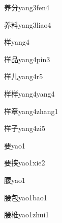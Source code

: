 \begin{verbete}[9;4]{养分}{yang3fen4}
\end{verbete}

\begin{verbete}[9;10]{养料}{yang3liao4}
\end{verbete}

\begin{verbete}[10]{样}{yang4}
\end{verbete}

\begin{verbete}[10;9]{样品}{yang4pin3}
\end{verbete}

\begin{verbete}[10;2]{样儿}{yang4r5}
\end{verbete}

\begin{verbete}[10;10]{样样}{yang4yang4}
\end{verbete}

\begin{verbete}[10;11]{样章}{yang4zhang1}
\end{verbete}

\begin{verbete}[10;3]{样子}{yang4zi5}
\end{verbete}

\begin{verbete}[9]{要}{yao1}
\end{verbete}

\begin{verbete}[9;9]{要挟}{yao1xie2}
\end{verbete}

\begin{verbete}[13]{腰}{yao1}
\end{verbete}

\begin{verbete}[13;5]{腰包}{yao1bao1}
\end{verbete}

\begin{verbete}[13;12]{腰椎}{yao1zhui1}
\end{verbete}


